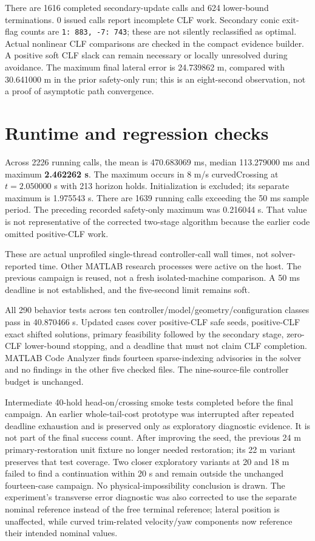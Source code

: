 \documentclass[11pt]{article}
\begin{document}
There are 1616 completed secondary-update calls and 624 lower-bound
terminations. 0 issued calls report incomplete CLF work.
Secondary conic exit-flag counts are \texttt{1: 883, -7: 743}; these are not silently
reclassified as optimal. Actual nonlinear CLF comparisons are checked in the
compact evidence builder. A positive soft CLF slack can remain necessary or
locally unresolved during avoidance. The maximum final lateral error is
24.739862 m, compared with 30.641000 m in the prior safety-only run; this is an
eight-second observation, not a proof of asymptotic path convergence.

\section{Runtime and regression checks}
Across 2226 running calls, the mean is 470.683069 ms, median 113.279000 ms and
maximum \textbf{2.462262 s}. The maximum occurs in 8 m/s curvedCrossing
at $t=2.050000$ s with 213 horizon holds. Initialization is excluded;
its separate maximum is 1.975543 s. There are 1639 running calls exceeding
the 50 ms sample period. The preceding recorded safety-only maximum was
0.216044 s. That value is not representative of the corrected two-stage
algorithm because the earlier code omitted positive-CLF work.

These are actual unprofiled single-thread controller-call wall times, not
solver-reported time. Other MATLAB research processes were active on the host.
The previous campaign is reused, not a fresh isolated-machine comparison.
A 50 ms deadline is not established, and the five-second limit remains soft.

All 290 behavior tests across ten controller/model/geometry/configuration
classes pass in 40.870466 s. Updated cases cover positive-CLF safe seeds,
positive-CLF exact shifted solutions, primary feasibility followed by the
secondary stage, zero-CLF lower-bound stopping, and a deadline that must not
claim CLF completion. MATLAB Code Analyzer finds fourteen sparse-indexing
advisories in the solver and no findings in the other five checked files.
The nine-source-file controller budget is unchanged.

Intermediate 40-hold head-on/crossing smoke tests completed before the final campaign.
An earlier whole-tail-cost prototype was interrupted after repeated deadline
exhaustion and is preserved only as exploratory diagnostic evidence. It is not
part of the final success count. After improving the seed, the previous 24 m primary-restoration unit fixture no longer needed restoration; its 22 m variant preserves that test coverage. Two closer exploratory variants at 20 and 18 m failed to find a continuation within 20 s and remain outside the unchanged fourteen-case campaign. No physical-impossibility conclusion is drawn. The experiment's transverse error diagnostic
was also corrected to use the separate nominal reference instead of the free
terminal reference; lateral position is unaffected, while curved trim-related
velocity/yaw components now reference their intended nominal values.
\end{document}

